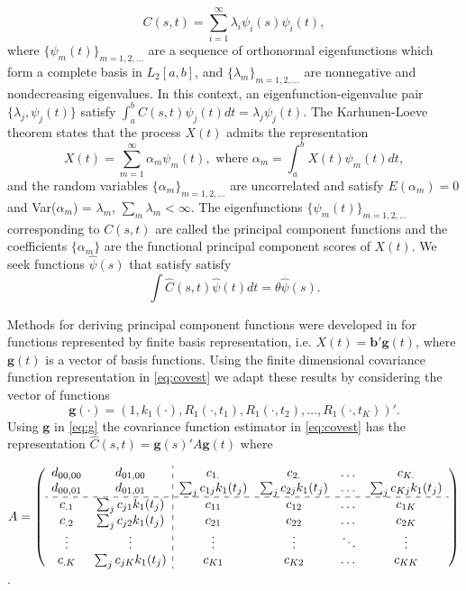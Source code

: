 \begin{equation*}
	C(s,t) = \sum_{i=1}^{\infty}\lambda_i\psi_i(s)\psi_i(t), 
\end{equation*}
where $\{\psi_m(t)\}_{m=1,2,\ldots}$ are a sequence of orthonormal eigenfunctions which form a complete basis in $L_2[a,b]$, and $\{\lambda_m \}_{m=1,2,\ldots}$ are nonnegative and nondecreasing eigenvalues. In this context, an eigenfunction-eigenvalue pair $\{\lambda_j, \psi_j(t)\}$ satisfy $\int_a^bC(s,t)\psi_j(t)dt = \lambda_j\psi_j(t)$. The Karhunen-Loeve theorem states that the process $X(t)$ admits the representation 
\begin{equation*}
	X(t) = \sum_{m=1}^{\infty}\alpha_m \psi_m(t), \mbox{ where } \alpha_m = \int_a^b X(t) \psi_m(t)dt, 
\end{equation*}
and the random variables $\{\alpha_m \}_{m=1,2,\ldots}$ are uncorrelated and satisfy $E(\alpha_m)=0$ and Var($\alpha_m$) = $\lambda_m$, $\sum_m \lambda_m < \infty$. The eigenfunctions $\{\psi_m(t)\}_{m=1,2,\ldots}$ corresponding to $C(s,t)$ are called the principal component functions and the coefficients $\{\alpha_m \}$ are the functional principal component scores of $X(t)$. We seek functions $\hat{\psi}(s)$ that satisfy satisfy 
\begin{equation}
	\label{eq:eigenfuns} \int \hat{C}(s,t)\hat{\psi}(t)dt=\theta\hat{\psi}(s). 
\end{equation}

Methods for deriving principal component functions were developed in \cite{FDA} for functions represented by finite basis representation, i.e. $X(t) = \mathbf{b}'\mathbf{g}(t)$, where $\mathbf{g}(t)$ is a vector of basis functions. Using the finite dimensional covariance function representation in \eqref{eq:covest} we adapt these results by considering the vector of functions 
\begin{equation}
	\mathbf{g(\cdot)}=(1, k_1(\cdot),R_{1}(\cdot, t_1),R_{1}(\cdot, t_2),\dots, R_{1}(\cdot, t_K))'. \label{eq:g} 
\end{equation}
Using $\mathbf{g}$ in \eqref{eq:g} the covariance function estimator in \eqref{eq:covest} has the representation $\hat{C}(s,t)= \mathbf{g}(s)'A\mathbf{g}(t)$ where \vspace{0.8cm} 
\begin{center}
	$A = \left( 
	\begin{array}{cc:cccc}
		d_{00,00} & d_{01,00} & c_{1.} & c_{2.} & \dots & c_{K.}\\
		d_{00,01} & d_{01,01} & \sum_j c_{1j}k_1(t_j) & \sum_j c_{2j}k_1(t_j) & \dots & \sum_j c_{Kj}k_1(t_j)\\
		\hdashline c_{.1} & \sum_j c_{j1}k_1(t_j) & c_{11} & c_{12} & \dots & c_{1K}\\
		c_{.2} & \sum_j c_{j2}k_1(t_j) & c_{21} & c_{22} & \dots & c_{2K}\\
		\vdots & \vdots & \vdots & \vdots & \ddots & \vdots \\
		c_{.K} & \sum_j c_{jK}k_1(t_j) & c_{K1} & c_{K2} & \dots & c_{KK} 
	\end{array}
	\right)$. 
\end{center}
\vspace{0.8cm} 

